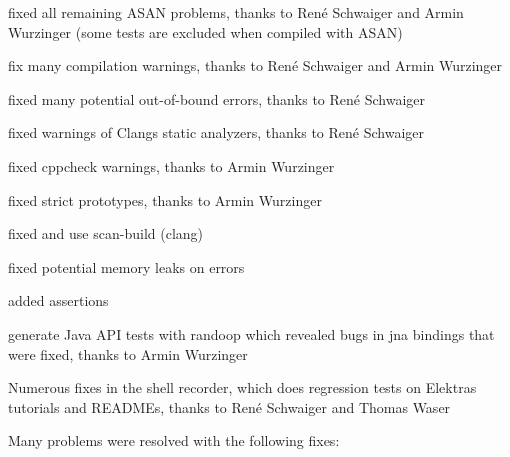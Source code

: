 \begin{DoxyItemize}
\item fixed all remaining A\+S\+AN problems, thanks to René Schwaiger and Armin Wurzinger (some tests are excluded when compiled with A\+S\+AN)
\item fix many compilation warnings, thanks to René Schwaiger and Armin Wurzinger
\item fixed many potential out-\/of-\/bound errors, thanks to René Schwaiger
\item fixed warnings of Clang\textquotesingle{}s static analyzers, thanks to René Schwaiger
\item fixed cppcheck warnings, thanks to Armin Wurzinger
\item fixed strict prototypes, thanks to Armin Wurzinger
\item fixed and use scan-\/build (clang)
\item fixed potential memory leaks on errors
\item added assertions
\item generate Java A\+PI tests with randoop which revealed bugs in jna bindings that were fixed, thanks to Armin Wurzinger
\item Numerous fixes in the shell recorder, which does regression tests on Elektra\textquotesingle{}s tutorials and R\+E\+A\+D\+M\+Es, thanks to René Schwaiger and Thomas Waser
\end{DoxyItemize}

Many problems were resolved with the following fixes\+:


